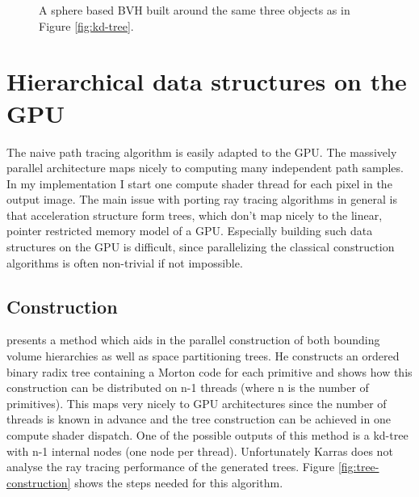 \documentclass{ACGSeminar}
\begin{document}
\begin{figure}[htb!]
  \centering
  
  \caption{A sphere based BVH built around the same three objects as in Figure \ref{fig:kd-tree}.}
  \label{fig:bvh}
\end{figure}

\section{Hierarchical data structures on the GPU} \label{gpu-adapting}
The naive path tracing algorithm is easily adapted to the GPU. The massively parallel architecture maps nicely to computing many independent path samples. In my implementation I start one compute shader thread for each pixel in the output image. The main issue with porting ray tracing algorithms in general is that acceleration structure form trees, which don't map nicely to the linear, pointer restricted memory model of a GPU. Especially building such data structures on the GPU is difficult, since parallelizing the classical construction algorithms is often non-trivial if not impossible. \cite[1]{Karras:2012:MPC:2383795.2383801}
\subsection{Construction}
\citet{Karras:2012:MPC:2383795.2383801} presents a method which aids in the parallel construction of both bounding volume hierarchies as well as space partitioning trees. He constructs an ordered binary radix tree containing a Morton code for each primitive and shows how this construction can be distributed on n-1 threads (where n is the number of primitives). This maps very nicely to GPU architectures since the number of threads is known in advance and the tree construction can be achieved in one compute shader dispatch. One of the possible outputs of this method is a kd-tree with n-1 internal nodes (one node per thread). Unfortunately Karras does not analyse the ray tracing performance of the generated trees. Figure \ref{fig:tree-construction} shows the steps needed for this algorithm.
\end{document}
